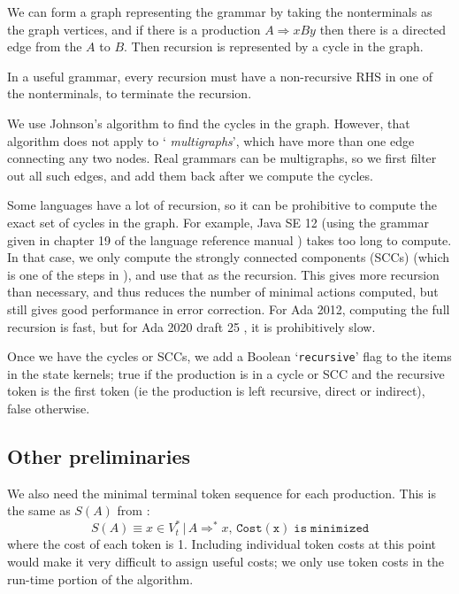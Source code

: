 \documentclass[authordraft]{acmart}
\newcommand{\code}[1]{`\lstinline|#1|'}
\begin{document}
We can form a graph representing the grammar by taking the
nonterminals as the graph vertices, and if there is a production $A
\Rightarrow xBy$ then there is a directed edge from the $A$ to $B$.
Then recursion is represented by a cycle in the graph.

In a useful grammar, every recursion must have a non-recursive
RHS in one of the nonterminals, to terminate the recursion.

We use Johnson's algorithm \citep{graph-cycles} to find the cycles in
the graph. However, that algorithm does not apply to `{\it
  multigraphs}', which have more than one edge connecting any two
nodes. Real grammars can be multigraphs, so we first filter out all
such edges, and add them back after we compute the cycles.

Some languages have a lot of recursion, so it can be prohibitive to
compute the exact set of cycles in the graph. For example, Java SE 12
(using the grammar given in chapter 19 of the language reference
manual \citep{javarm}) takes too long to compute. In that case, we only
compute the strongly connected components (SCCs) (which is one of the
steps in \citet{graph-cycles}), and use that as the recursion. This
gives more recursion than necessary, and thus reduces the number of
minimal actions computed, but still gives good performance in error
correction. For Ada 2012, computing the full recursion is fast, but
for Ada 2020 draft 25 \citep{Ada_2020}, it is prohibitively slow.

Once we have the cycles or SCCs, we add a Boolean \code{recursive}
flag to the items in the state kernels; true if the production is in a
cycle or SCC and the recursive token is the first token (ie the
production is left recursive, direct or indirect), false otherwise.

\subsection{Other preliminaries}
We also need the minimal terminal token sequence for each production.
This is the same as $S(A)$ from \citet{FMQ_1980}:
\begin{equation}
S(A) \equiv x \in V_t^* \, |\, A \Rightarrow^* x, \, \mathtt{Cost(x)\; is\; minimized}
\end{equation}
where the cost of each token is 1. Including individual token costs at
this point would make it very difficult to assign useful costs; we
only use token costs in the run-time portion of the algorithm.
\end{document}
